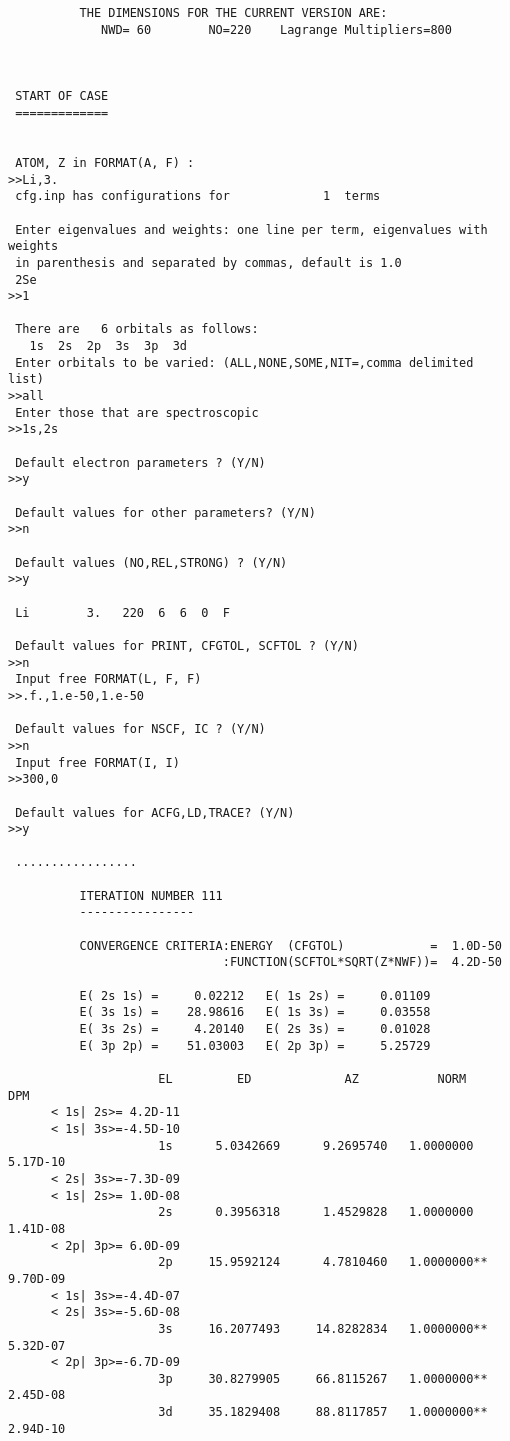 \documentclass[fleqn,10pt]{book}
\begin{document}
\begin{verbatim}
          THE DIMENSIONS FOR THE CURRENT VERSION ARE:
             NWD= 60        NO=220    Lagrange Multipliers=800



 START OF CASE
 =============


 ATOM, Z in FORMAT(A, F) :
>>Li,3.
 cfg.inp has configurations for             1  terms

 Enter eigenvalues and weights: one line per term, eigenvalues with weights
 in parenthesis and separated by commas, default is 1.0
 2Se
>>1

 There are   6 orbitals as follows:
   1s  2s  2p  3s  3p  3d
 Enter orbitals to be varied: (ALL,NONE,SOME,NIT=,comma delimited list)
>>all
 Enter those that are spectroscopic
>>1s,2s

 Default electron parameters ? (Y/N)
>>y

 Default values for other parameters? (Y/N)
>>n

 Default values (NO,REL,STRONG) ? (Y/N)
>>y

 Li        3.   220  6  6  0  F

 Default values for PRINT, CFGTOL, SCFTOL ? (Y/N)
>>n
 Input free FORMAT(L, F, F)
>>.f.,1.e-50,1.e-50

 Default values for NSCF, IC ? (Y/N)
>>n
 Input free FORMAT(I, I)
>>300,0

 Default values for ACFG,LD,TRACE? (Y/N)
>>y

 .................
 
          ITERATION NUMBER 111
          ----------------

          CONVERGENCE CRITERIA:ENERGY  (CFGTOL)            =  1.0D-50
                              :FUNCTION(SCFTOL*SQRT(Z*NWF))=  4.2D-50

          E( 2s 1s) =     0.02212   E( 1s 2s) =     0.01109
          E( 3s 1s) =    28.98616   E( 1s 3s) =     0.03558
          E( 3s 2s) =     4.20140   E( 2s 3s) =     0.01028
          E( 3p 2p) =    51.03003   E( 2p 3p) =     5.25729

                     EL         ED             AZ           NORM       DPM
      < 1s| 2s>= 4.2D-11
      < 1s| 3s>=-4.5D-10
                     1s      5.0342669      9.2695740   1.0000000    5.17D-10
      < 2s| 3s>=-7.3D-09
      < 1s| 2s>= 1.0D-08
                     2s      0.3956318      1.4529828   1.0000000    1.41D-08
      < 2p| 3p>= 6.0D-09
                     2p     15.9592124      4.7810460   1.0000000**  9.70D-09
      < 1s| 3s>=-4.4D-07
      < 2s| 3s>=-5.6D-08
                     3s     16.2077493     14.8282834   1.0000000**  5.32D-07
      < 2p| 3p>=-6.7D-09
                     3p     30.8279905     66.8115267   1.0000000**  2.45D-08
                     3d     35.1829408     88.8117857   1.0000000**  2.94D-10


\end{verbatim}
\end{document}
